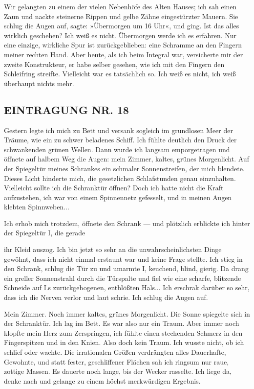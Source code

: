 Wir gelangten zu einem der vielen Nebenhöfe des Alten Hauses; ich
sah einen Zaun und nackte steinerne Rippen und gelbe Zähne
eingestürzter Mauern. Sie schlug die Augen auf, sagte: »Übermorgen
um 16 Uhr«, und ging. Ist das alles wirklich geschehen? Ich weiß es
nicht. Übermorgen werde ich es erfahren. Nur eine einzige,
wirkliche Spur ist zurückgeblieben: eine Schramme an den Fingern
meiner rechten Hand. Aber heute, als ich beim Integral war,
versicherte mir der zweite Konstrukteur, er habe selber gesehen,
wie ich mit den Fingern den Schleifring streifte. Vielleicht war es
tatsächlich so. Ich weiß es nicht, ich weiß überhaupt nichts mehr.

\subsection{EINTRAGUNG NR. 18}

Gestern legte ich mich zu Bett und versank sogleich im grundlosen
Meer der Träume, wie ein zu schwer beladenes Schiff. Ich fühlte
deutlich den Druck der schwankenden grünen Wellen. Dann wurde ich
langsam emporgetragen und öffnete auf halbem Weg die Augen: mein
Zimmer, kaltes, grünes Morgenlicht. Auf der Spiegeltür meines
Schrankes ein schmaler Sonnenstreifen, der mich blendete. Dieses
Licht hinderte mich, die gesetzlichen Schlafstunden genau
einzuhalten. Vielleicht sollte ich die Schranktür öffnen? Doch ich
hatte nicht die Kraft aufzustehen, ich war von einem Spinnennetz
gefesselt, und in meinen Augen klebten Spinnweben...

Ich erhob mich trotzdem, öffnete den Schrank — und plötzlich
erblickte ich hinter der Spiegeltür I, die gerade

ihr Kleid auszog. Ich bin jetzt so sehr an die unwahrscheinlichsten
Dinge gewöhnt, dass ich nicht einmal erstaunt war und keine Frage
stellte. Ich stieg in den Schrank, schlug die Tür zu und umarmte I,
keuchend, blind, gierig. Da drang ein greller Sonnenstrahl durch
die Türspalte und fiel wie eine scharfe, blitzende Schneide auf I.s
zurückgebogenen, entblößten Hals... Ich erschrak darüber so sehr,
dass ich die Nerven verlor und laut schrie. Ich schlug die Augen
auf.

Mein Zimmer. Noch immer kaltes, grünes Morgenlicht. Die Sonne
spiegelte sich in der Schranktür. Ich lag im Bett. Es war also nur
ein Traum. Aber immer noch klopfte mein Herz zum Zerspringen, ich
fühlte einen stechenden Schmerz in den Fingerspitzen und in den
Knien. Also doch kein Traum. Ich wusste nicht, ob ich schlief oder
wachte. Die irrationalen Größen verdrängten alles Dauerhafte,
Gewohnte, und statt fester, geschliffener Flächen sah ich ringsum
nur raue, zottige Massen. Es dauerte noch lange, bis der Wecker
rasselte. Ich liege da, denke nach und gelange zu einem höchst
merkwürdigen Ergebnis.

